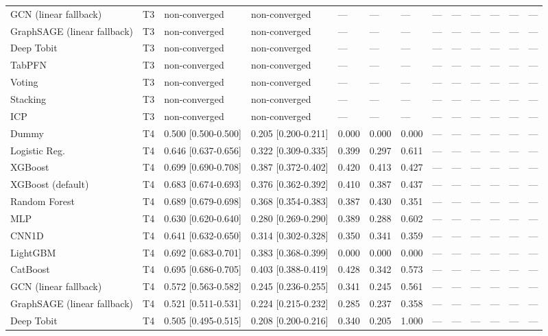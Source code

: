 \begin{table}
\begin{tabular}{lllllllllllll}
GCN (linear fallback) & T3 & non-converged & non-converged & — & — & — & — & — & — & — & — & — \\
GraphSAGE (linear fallback) & T3 & non-converged & non-converged & — & — & — & — & — & — & — & — & — \\
Deep Tobit & T3 & non-converged & non-converged & — & — & — & — & — & — & — & — & — \\
TabPFN & T3 & non-converged & non-converged & — & — & — & — & — & — & — & — & — \\
Voting & T3 & non-converged & non-converged & — & — & — & — & — & — & — & — & — \\
Stacking & T3 & non-converged & non-converged & — & — & — & — & — & — & — & — & — \\
ICP & T3 & non-converged & non-converged & — & — & — & — & — & — & — & — & — \\
Dummy & T4 & 0.500 [0.500-0.500] & 0.205 [0.200-0.211] & 0.000 & 0.000 & 0.000 & — & — & — & — & — & — \\
Logistic Reg. & T4 & 0.646 [0.637-0.656] & 0.322 [0.309-0.335] & 0.399 & 0.297 & 0.611 & — & — & — & — & — & — \\
XGBoost & T4 & 0.699 [0.690-0.708] & 0.387 [0.372-0.402] & 0.420 & 0.413 & 0.427 & — & — & — & — & — & — \\
XGBoost (default) & T4 & 0.683 [0.674-0.693] & 0.376 [0.362-0.392] & 0.410 & 0.387 & 0.437 & — & — & — & — & — & — \\
Random Forest & T4 & 0.689 [0.679-0.698] & 0.368 [0.354-0.383] & 0.387 & 0.430 & 0.351 & — & — & — & — & — & — \\
MLP & T4 & 0.630 [0.620-0.640] & 0.280 [0.269-0.290] & 0.389 & 0.288 & 0.602 & — & — & — & — & — & — \\
CNN1D & T4 & 0.641 [0.632-0.650] & 0.314 [0.302-0.328] & 0.350 & 0.341 & 0.359 & — & — & — & — & — & — \\
LightGBM & T4 & 0.692 [0.683-0.701] & 0.383 [0.368-0.399] & 0.000 & 0.000 & 0.000 & — & — & — & — & — & — \\
CatBoost & T4 & 0.695 [0.686-0.705] & 0.403 [0.388-0.419] & 0.428 & 0.342 & 0.573 & — & — & — & — & — & — \\
GCN (linear fallback) & T4 & 0.572 [0.563-0.582] & 0.245 [0.236-0.255] & 0.341 & 0.245 & 0.561 & — & — & — & — & — & — \\
GraphSAGE (linear fallback) & T4 & 0.521 [0.511-0.531] & 0.224 [0.215-0.232] & 0.285 & 0.237 & 0.358 & — & — & — & — & — & — \\
Deep Tobit & T4 & 0.505 [0.495-0.515] & 0.208 [0.200-0.216] & 0.340 & 0.205 & 1.000 & — & — & — & — & — & — \\

\end{tabular}
\end{table}
